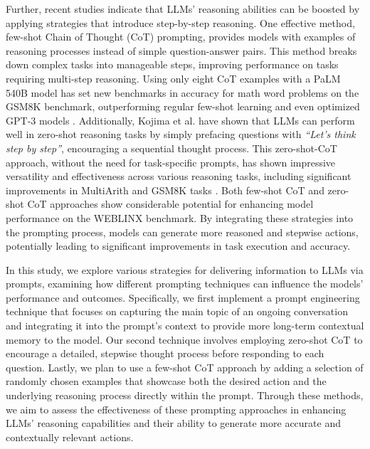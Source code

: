 \documentclass[11pt]{article}
\begin{document}
Further, recent studies indicate that LLMs' reasoning abilities can be boosted by applying strategies that introduce step-by-step reasoning. One effective method, few-shot Chain of Thought (CoT) \cite{wei_2022_chain_of_thought_prompting_elicits_reasoning_large_language_models} prompting, provides models with examples of reasoning processes instead of simple question-answer pairs. This method breaks down complex tasks into manageable steps, improving performance on tasks requiring multi-step reasoning. Using only eight CoT examples with a PaLM 540B model has set new benchmarks in accuracy for math word problems on the GSM8K benchmark, outperforming regular few-shot learning and even optimized GPT-3 models \cite{wei_2022_chain_of_thought_prompting_elicits_reasoning_large_language_models}. Additionally, Kojima et al. \cite{Large_Language_Models_Zero_Shot_Reasoners} have shown that LLMs can perform well in zero-shot reasoning tasks by simply prefacing questions with \textit{“Let’s think step by step”}, encouraging a sequential thought process. This zero-shot-CoT approach, without the need for task-specific prompts, has shown impressive versatility and effectiveness across various reasoning tasks, including significant improvements in MultiArith and GSM8K tasks \cite{Large_Language_Models_Zero_Shot_Reasoners}. Both few-shot CoT and zero-shot CoT approaches show considerable potential for enhancing model performance on the WEBLINX benchmark. By integrating these strategies into the prompting process, models can generate more reasoned and stepwise actions, potentially leading to significant improvements in task execution and accuracy.

In this study, we explore various strategies for delivering information to LLMs via prompts, examining how different prompting techniques can influence the models' performance and outcomes. Specifically, we first implement a prompt engineering technique that focuses on capturing the main topic of an ongoing conversation and integrating it into the prompt's context to provide more long-term contextual memory to the model. Our second technique involves employing zero-shot CoT to encourage a detailed, stepwise thought process before responding to each question. Lastly, we plan to use a few-shot CoT approach by adding a selection of randomly chosen examples that showcase both the desired action and the underlying reasoning process directly within the prompt. Through these methods, we aim to assess the effectiveness of these prompting approaches in enhancing LLMs' reasoning capabilities and their ability to generate more accurate and contextually relevant actions.
\end{document}
